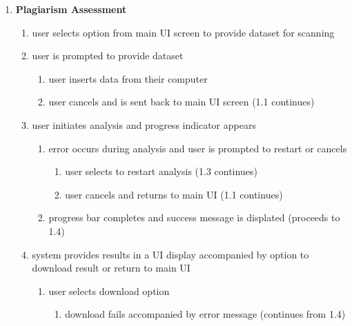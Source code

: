 \documentclass[12pt]{article}
\begin{document}
\begin{enumerate}

    \item \textbf{Plagiarism Assessment}

    \begin{enumerate}

        \item user selects option from main UI screen to provide dataset for scanning

        \item user is prompted to provide dataset
        \begin{enumerate}
            \item user inserts data from their computer

            \item user cancels and is sent back to main UI screen (1.1 continues)
        \end{enumerate}

        \item user initiates analysis and progress indicator appears

        \begin{enumerate}
            \item error occurs during analysis and user is prompted to restart or cancels

            \begin{enumerate}
                \item user selects to restart analysis (1.3 continues)

                \item user cancels and returns to main UI (1.1 continues)

            \end{enumerate}

            \item progress bar completes and success message is displated (proceeds to 1.4)
        \end{enumerate}

        \item system provides results in a UI display accompanied by option to download result or return to main UI

        \begin{enumerate}
            \item user selects download option

            \begin{enumerate}
                \item download fails accompanied by error message (continues from 1.4)


\end{enumerate}
\end{enumerate}
\end{enumerate}
\end{enumerate}
\end{document}
